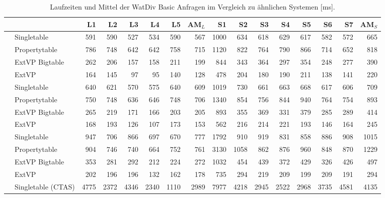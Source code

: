 \documentclass[
  a4paper,
  twocolumn
]{scrartcl}
\begin{document}
\begin{table*}[htb!]
	\centering
	\tiny
 	\caption{Laufzeiten und Mittel der WatDiv Basic Anfragen im Vergleich zu ähnlichen Systemen [ms].}
  	\label{table:runtime:watdiv:basic}

	\begin{tabular*}{\textwidth}{ @{\extracolsep{\fill}} llrrrrr|r|rrrrrrr|r }
		\toprule
		 & & L1 & L2 & L3 & L4 & L5 & AM$_L$ & S1 & S2 & S3 & S4 & S5 & S6 & S7 & AM$_S$ \\ 
		\midrule
		\multirow{4}{*}{\rotatebox{90}{SF10}}  
		 & Singletable & 591 & 590 & 527 & 534 & 590 & 567 & 1000 & 634 & 618 & 629 & 617 & 582 & 572 & 665 \\ 
		 & Propertytable & 786 & 748 & 642 & 642 & 758 & 715 & 1120 & 822 & 764 & 790 & 866 & 714 & 652 & 818 \\ 
		 & ExtVP Bigtable & 262 & 206 & 157 & 158 & 211 & 199 & 844 & 343 & 364 & 297 & 354 & 248 & 277 & 390 \\ 
		 & ExtVP & 164 & 145 & 97 & 95 & 140 & 128 & 478 & 204 & 180 & 190 & 211 & 138 & 141 & 220 \\ 
		\midrule
		\multirow{4}{*}{\rotatebox{90}{SF100}} 
		 & Singletable & 640 & 621 & 570 & 575 & 640 & 609 & 1019 & 730 & 661 & 663 & 668 & 617 & 606 & 709 \\ 
		 & Propertytable & 750 & 748 & 636 & 646 & 748 & 706 & 1340 & 854 & 756 & 844 & 940 & 764 & 754 & 893 \\ 
		 & ExtVP Bigtable & 265 & 219 & 171 & 166 & 203 & 205 & 893 & 355 & 369 & 331 & 379 & 285 & 289 & 414 \\ 
		 & ExtVP & 168 & 193 & 126 & 107 & 173 & 153 & 562 & 216 & 214 & 221 & 193 & 146 & 164 & 245 \\ 
		\midrule
		\multirow{4}{*}{\rotatebox{90}{SF1000}} 
		 & Singletable & 947 & 706 & 866 & 697 & 670 & 777 & 1792 & 910 & 919 & 831 & 858 & 886 & 908 & 1015 \\ 
		 & Propertytable & 904 & 746 & 740 & 664 & 752 & 761 & 3130 & 1058 & 862 & 876 & 960 & 848 & 870 & 1229 \\ 
		 & ExtVP Bigtable & 353 & 281 & 292 & 212 & 224 & 272 & 1032 & 454 & 439 & 372 & 429 & 326 & 426 & 497 \\ 
		 & ExtVP & 202 & 196 & 196 & 132 & 162 & 178 & 735 & 294 & 219 & 209 & 199 & 209 & 191 & 294 \\ 
		\midrule
		\multirow{7}{*}{\rotatebox{90}{SF10000}} 
		 & Singletable (CTAS) & 4775 & 2372 & 4346 & 2340 & 1110 & 2989 & 7977 & 4218 & 2945 & 2522 & 2968 & 3735 & 4581 & 4135 \\ 

\end{tabular*}
\end{table*}
\end{document}
